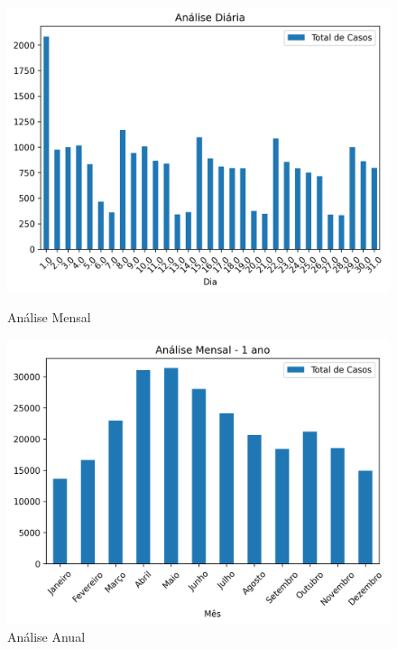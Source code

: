 \documentclass{article}%
\begin{document}
\begin{figure}[H]%
\begin{minipage}{0.45\textwidth}%
\centering%
\includegraphics[width=\textwidth]{../graphics/monthly-analysis.png}%
\caption{Análise Mensal}%
\label{fig:casos-30-dias}%
\end{minipage}%
\begin{minipage}{0.45\textwidth}%
\centering%
\includegraphics[width=\textwidth]{../graphics/yearly-analysis.png}%
\caption{Análise Anual}%
\label{fig:casos-12-meses}%
\end{minipage}%
\end{figure}

%
\end{document}
